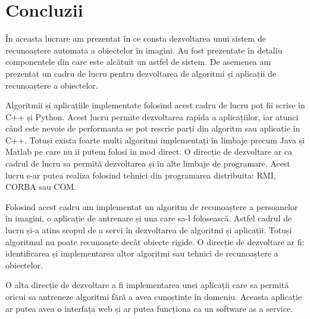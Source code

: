 \chapter{Concluzii}

În aceasta lucrare am prezentat în ce consta dezvoltarea unui sistem de recunoaștere automata a obiectelor în imagini. Au fost prezentate în detaliu componentele din care este alcătuit un astfel de sistem. De asemenea am prezentat un cadru de lucru pentru dezvoltarea de algoritmi și aplicații de recunoaștere a obiectelor.

Algoritmii și aplicațiile implementate folosind acest cadru de lucru pot fii scrise în C++ și Python.
Acest lucru permite dezvoltarea rapida a aplicațiilor, iar atunci când este nevoie de performanta se pot rescrie parți din algoritm sau aplicație în C++.
Totuși exista foarte multi algoritmi implementați în limbaje precum Java și Matlab pe care nu ii putem folosi în mod direct.
O direcție de dezvoltare ar ca cadrul de lucru sa permită dezvoltarea și în alte limbaje de programare. Acest lucru s-ar putea realiza folosind tehnici din programarea distribuita: RMI, CORBA sau COM.

Folosind acest cadru am implementat un algoritm de recunoaștere a persoanelor în imagini, o aplicație de antrenare și una care sa-l folosească.
Astfel cadrul de lucru și-a atins scopul de a servi în dezvoltarea de algoritmi și aplicații.
Totuși algoritmul nu poate recunoaște decât obiecte rigide.
O direcție de dezvoltare ar fi: identificarea și implementarea altor algoritmi sau tehnici de recunoaștere a obiectelor.

O alta direcție de dezvoltare a fi implementarea unei aplicații care sa permită oricui sa antreneze algoritmi fără a avea cunoștințe în domeniu. Aceasta aplicație ar putea avea o interfața web și ar putea funcționa ca un software as a service.




